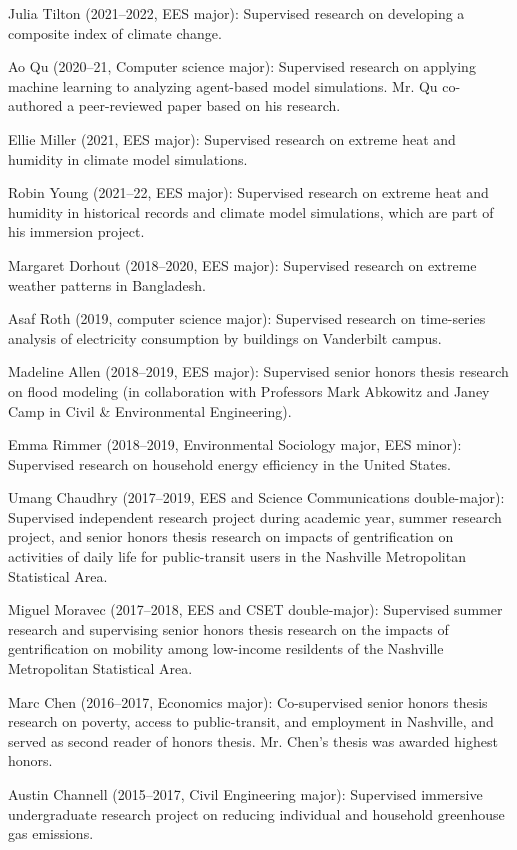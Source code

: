 \item Julia Tilton (2021--2022, EES major): Supervised research on developing
a composite index of climate change.
\item Ao Qu (2020--21, Computer science major): Supervised research on applying
machine learning to analyzing agent-based model simulations. Mr. Qu co-authored
a peer-reviewed paper based on his research.
\item Ellie Miller (2021, EES major): Supervised research on extreme heat and
humidity in climate model simulations.
\item Robin Young (2021--22, EES major): Supervised research on extreme heat
and humidity in historical records and climate model simulations, which are
part of his immersion project.
\item Margaret Dorhout (2018--2020, EES major): Supervised research on extreme weather patterns in Bangladesh.
\item Asaf Roth (2019, computer science major): Supervised research on time-series analysis of electricity consumption by buildings on Vanderbilt campus.
\item Madeline Allen (2018--2019, EES major): Supervised senior honors thesis research on flood modeling (in collaboration with Professors Mark Abkowitz and Janey Camp in Civil \& Environmental Engineering).
\item Emma Rimmer (2018--2019, Environmental Sociology major, EES minor): Supervised research on household energy efficiency in the United States.
\item Umang Chaudhry (2017--2019, EES and Science Communications double-major): Supervised independent research project during academic year, summer research project, and senior honors thesis research on impacts of gentrification on activities of daily life
for public-transit users in the Nashville Metropolitan Statistical Area.
\item Miguel Moravec (2017--2018, EES and CSET double-major): Supervised summer research and supervising senior honors thesis research on the impacts of gentrification on mobility among low-income resildents of the Nashville Metropolitan Statistical Area.
\item Marc Chen (2016--2017, Economics major): Co-supervised senior honors thesis research on poverty, access to public-transit, and employment in Nashville, and served as second reader of honors thesis. Mr. Chen's thesis was awarded highest honors.
\item Austin Channell (2015--2017, Civil Engineering major): Supervised immersive undergraduate research project on reducing individual and household greenhouse gas emissions.
